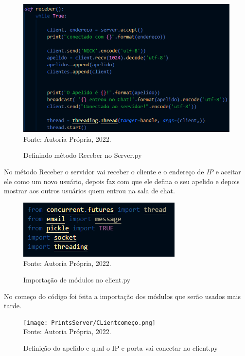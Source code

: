 \newpage\thispagestyle{empty}
\begin{figure}[htbp]
	\centering
	\caption{Definindo método Receber no Server.py}
	\includegraphics[]{PrintsServer/Receber.png}
	{\\Fonte: Autoria Própria, 2022.}
	\label{fig:criação_1}
\end{figure}

\par No método Receber o servidor vai receber o cliente e o endereço de \textit{IP} e aceitar ele como um novo usuário, depois faz com que ele defina o seu apelido e depois mostrar aos outros usuários quem entrou na sala de chat.
\newline

\begin{figure}[htbp]
	\centering
	\caption{Importação de módulos no client.py}
	\includegraphics[]{PrintsServer/clientimport.png}
	{\\Fonte: Autoria Própria, 2022.}
	\label{fig:criação_1}
\end{figure}

\par No começo do código foi feita a importação dos módulos que serão usados mais tarde.
\newline
\newpage\thispagestyle{empty}
\begin{figure}[htbp]
	\centering
	\caption{Definição do apelido e qual o IP e porta vai conectar no client.py}
	\texttt{[image: PrintsServer/CLientcomeço.png]}
	{\\Fonte: Autoria Própria, 2022.}
	\label{fig:criação_1}
\end{figure}


